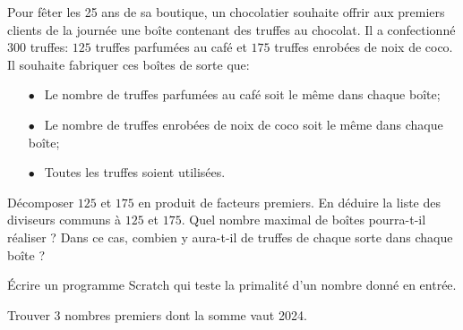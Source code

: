 \documentclass["../Cours.tex"]{subfiles}
\begin{document}
\begin{questions}
    Pour fêter les 25 ans de sa boutique, un chocolatier souhaite offrir aux premiers clients de la journée une boîte contenant des truffes au chocolat. Il a confectionné $300$ truffes: $125$ truffes parfumées au café et $175$ truffes enrobées de noix de coco. Il souhaite fabriquer ces boîtes de sorte que:

    \begin{itemize}
    \item[$\bullet~~$] Le nombre de truffes parfumées au café soit le même dans chaque boîte;
    \item[$\bullet~~$] Le nombre de truffes enrobées de noix de coco soit le même dans chaque boîte;
    \item[$\bullet~~$] Toutes les truffes soient utilisées.
    \end{itemize}

	\question Décomposer $125$ et $175$ en produit de facteurs premiers.
	\question En déduire la liste des diviseurs communs à $125$ et $175$.
	\question Quel nombre maximal de boîtes pourra-t-il réaliser ?
	\question Dans ce cas, combien y aura-t-il de truffes de chaque sorte dans chaque boîte ?

    \exercice Écrire un programme Scratch qui teste la primalité d'un nombre donné en entrée.

    \exercice Trouver 3 nombres premiers dont la somme vaut 2024.

    
\end{questions}
\end{document}
